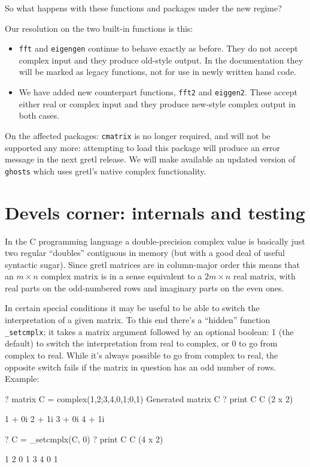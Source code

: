 \documentclass{article}
\begin{document}
So what happens with these functions and packages under the new
regime?

Our resolution on the two built-in functions is this:
\begin{itemize}
\item \texttt{fft} and \texttt{eigengen} continue to behave exactly as
  before. They do not accept complex input and they produce old-style
  output. In the documentation they will be marked as legacy
  functions, not for use in newly written hansl code.
\item We have added new counterpart functions, \texttt{fft2} and
  \texttt{eiggen2}. These accept either real or complex input and they
  produce new-style complex output in both cases.
\end{itemize}

On the affected packages: \texttt{cmatrix} is no longer required, and
will not be supported any more: attempting to load this package will
produce an error message in the next gretl release. We will make
available an updated version of \texttt{ghosts} which uses gretl's
native complex functionality.

\section{Devels corner: internals and testing}

In the \textsf{C} programming language a double-precision complex
value is basically just two regular ``doubles'' contiguous in memory
(but with a good deal of useful syntactic sugar). Since gretl matrices
are in column-major order this means that an $m \times n$ complex
matrix is in a sense equivalent to a $2m \times n$ real matrix, with
real parts on the odd-numbered rows and imaginary parts on the even
ones.

In certain special conditions it may be useful to be able to switch
the interpretation of a given matrix. To this end there's a ``hidden''
function \verb|_setcmplx|; it takes a matrix argument followed by an
optional boolean: 1 (the default) to switch the interpretation from
real to complex, or 0 to go from complex to real. While it's always
possible to go from complex to real, the opposite switch fails if the
matrix in question has an odd number of rows. Example:
\begin{code}
? matrix C = complex({1,2;3,4},{0,1;0,1})
Generated matrix C
? print C
C (2 x 2)

 1 + 0i   2 + 1i
 3 + 0i   4 + 1i

? C = _setcmplx(C, 0)
? print C
C (4 x 2)

  1   2
  0   1
  3   4
  0   1
\end{code}
\end{document}
